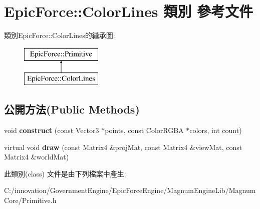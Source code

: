 \hypertarget{class_epic_force_1_1_color_lines}{}\section{Epic\+Force\+:\+:Color\+Lines 類別 參考文件}
\label{class_epic_force_1_1_color_lines}
類別\+Epic\+Force\+:\+:Color\+Lines的繼承圖\+:\begin{figure}[H]
\begin{center}
\leavevmode
\includegraphics[height=2.000000cm]{class_epic_force_1_1_color_lines}
\end{center}
\end{figure}
\subsection*{公開方法(Public Methods)}
\begin{DoxyCompactItemize}
\item 
void {\bfseries construct} (const Vector3 $\ast$points, const Color\+R\+G\+BA $\ast$colors, int count)\hypertarget{class_epic_force_1_1_color_lines_a5c10e3a5a3d30f6de4586a57a700c04e}{}\label{class_epic_force_1_1_color_lines_a5c10e3a5a3d30f6de4586a57a700c04e}

\item 
virtual void {\bfseries draw} (const Matrix4 \&proj\+Mat, const Matrix4 \&view\+Mat, const Matrix4 \&world\+Mat)\hypertarget{class_epic_force_1_1_color_lines_abaa95dafb0d127a8ec25787bcf0d3406}{}\label{class_epic_force_1_1_color_lines_abaa95dafb0d127a8ec25787bcf0d3406}

\end{DoxyCompactItemize}


此類別(class) 文件是由下列檔案中產生\+:\begin{DoxyCompactItemize}
\item 
C\+:/innovation/\+Government\+Engine/\+Epic\+Force\+Engine/\+Magnum\+Engine\+Lib/\+Magnum\+Core/Primitive.\+h\end{DoxyCompactItemize}
